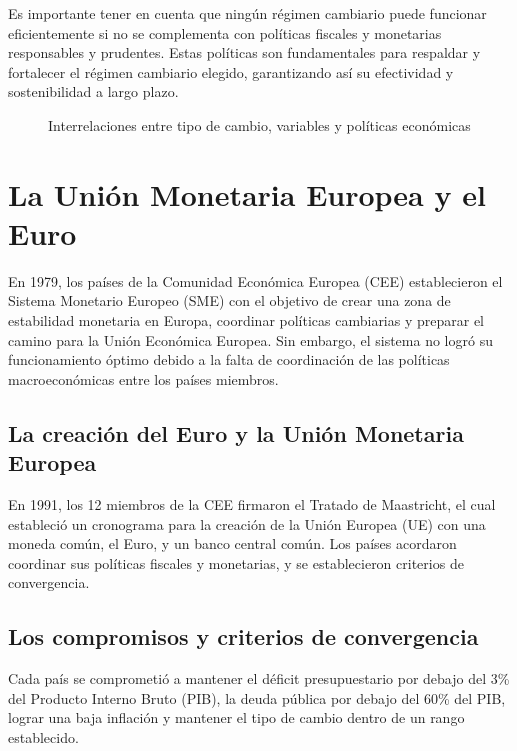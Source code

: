 \documentclass[
  jou,
  floatsintext,
  longtable,
  a4paper,
  nolmodern,
  notxfonts,
  notimes,
  12pt,
  colorlinks=true,linkcolor=blue,citecolor=blue,urlcolor=blue]{apa7}
\begin{document}
Es importante tener en cuenta que ningún régimen cambiario puede
funcionar eficientemente si no se complementa con políticas fiscales y
monetarias responsables y prudentes. Estas políticas son fundamentales
para respaldar y fortalecer el régimen cambiario elegido, garantizando
así su efectividad y sostenibilidad a largo plazo.

\begin{figure}

\caption{\label{fig-2}Interrelaciones entre tipo de cambio, variables y
políticas económicas}

\centering{

}

\end{figure}%

\section{La Unión Monetaria Europea y el
Euro}\label{la-uniuxf3n-monetaria-europea-y-el-euro}

En 1979, los países de la Comunidad Económica Europea (CEE)
establecieron el Sistema Monetario Europeo (SME) con el objetivo de
crear una zona de estabilidad monetaria en Europa, coordinar políticas
cambiarias y preparar el camino para la Unión Económica Europea. Sin
embargo, el sistema no logró su funcionamiento óptimo debido a la falta
de coordinación de las políticas macroeconómicas entre los países
miembros.

\subsection{La creación del Euro y la Unión Monetaria
Europea}\label{la-creaciuxf3n-del-euro-y-la-uniuxf3n-monetaria-europea}

En 1991, los 12 miembros de la CEE firmaron el Tratado de Maastricht, el
cual estableció un cronograma para la creación de la Unión Europea (UE)
con una moneda común, el Euro, y un banco central común. Los países
acordaron coordinar sus políticas fiscales y monetarias, y se
establecieron criterios de convergencia.

\subsection{Los compromisos y criterios de
convergencia}\label{los-compromisos-y-criterios-de-convergencia}

Cada país se comprometió a mantener el déficit presupuestario por debajo
del 3\% del Producto Interno Bruto (PIB), la deuda pública por debajo
del 60\% del PIB, lograr una baja inflación y mantener el tipo de cambio
dentro de un rango establecido.
\end{document}
